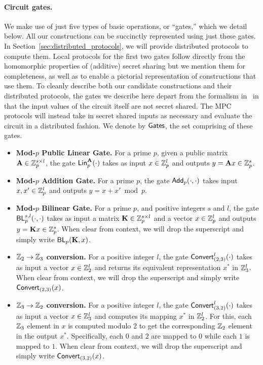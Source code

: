 \paragraph{Circuit gates.}
We make use of just five types of basic operations, or ``gates,'' which we detail below. All our constructions can be succinctly represented using just these gates. In Section~\ref{sec:distributed_protocols}, we will provide distributed protocols to compute them. Local protocols for the first two gates follow directly from the homomorphic properties of (additive) secret sharing but we mention them for completeness, as well as to enable a pictorial representation of constructions that use them. To cleanly describe both our candidate constructions and their distributed protocols, the gates we describe here depart from the formalism in~\cite{boyle2019-fss-preprocess} in that the input values of the circuit itself are not secret shared. The MPC protocols will instead take in secret shared inputs as necessary and evaluate the circuit in a distributed fashion. We denote by $\textnormal{\textsf{Gates}}$, the set comprising of these gates.

\begin{itemize}
    \item \textbf{Mod-$p$ Public Linear Gate.}
    For a prime $p$, given a public matrix $\mat{A} \in \Z_p^{s \times l}$, the gate $\LMap^\mat{A}_p(\cdot)$ takes as input $x \in \mathbb{Z}_p^l$ and outputs $y = \mat{A}x \in \Z_p^s$.

    \item \textbf{Mod-$p$ Addition Gate.}
    For a prime $p$, the gate $\textnormal{\textsf{Add}}_p(\cdot,\cdot)$ takes input $x,x' \in \mathbb{Z}_p^{l}$ and outputs $y = x + x' \bmod p$.

    \item \textbf{Mod-$p$ Bilinear Gate.}
    For a prime $p$, and positive integers $s$ and $l$, the gate $\textnormal{\textsf{BL}}_p^{s,l}(\cdot, \cdot)$ takes as input a matrix $\mat{K} \in \Z_p^{s \times l}$ and a vector $x \in \mathbb{Z}_p^l$ and outputs $y = \mat{K}x \in \Z_p^s$. When clear from context, we will drop the superscript and simply write $\BLMap_p(\mat{K}, x)$.
    
    \item \textbf{$\mathbb{Z}_2 \to \mathbb{Z}_3$ conversion.} For a positive integer $l$, the gate $\textnormal{\textsf{Convert}}^l_{(2,3)}(\cdot)$ takes as input a vector $x \in \mathbb{Z}_2^l$ and returns its equivalent representation $x^*$ in $\mathbb{Z}_3^l$. When clear from context, we will drop the superscript and simply write $\textnormal{\textsf{Convert}}_{(2,3)}(x)$.

    \item \textbf{$\mathbb{Z}_3 \to \mathbb{Z}_2$ conversion.} For a positive integer $l$, the gate $\textnormal{\textsf{Convert}}^l_{(3,2)}(\cdot)$ takes as input a vector $x \in \mathbb{Z}_3^l$ and computes its mapping $x^*$ in $\mathbb{Z}_2^l$. For this, each $\mathbb{Z}_3$ element in $x$ is computed modulo 2 to get the corresponding $\mathbb{Z}_2$ element in the output $x^*$. Specifically, each $0$ and $2$ are mapped to $0$ while each $1$ is mapped to $1$. When clear from context, we will drop the superscript and simply write $\textnormal{\textsf{Convert}}_{(3,2)}(x)$.
\end{itemize}


